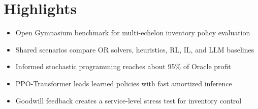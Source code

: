 \section*{Highlights}

\begin{itemize}
  \item Open Gymnasium benchmark for multi-echelon inventory policy evaluation
  \item Shared scenarios compare OR solvers, heuristics, RL, IL, and LLM baselines
  \item Informed stochastic programming reaches about 95\% of Oracle profit
  \item PPO-Transformer leads learned policies with fast amortized inference
  \item Goodwill feedback creates a service-level stress test for inventory control
\end{itemize}

